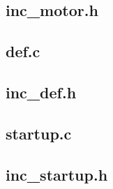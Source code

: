 \subsection{inc\_motor.h}


\subsection{def.c}


\subsection{inc\_def.h}


\subsection{startup.c}


\subsection{inc\_startup.h}

